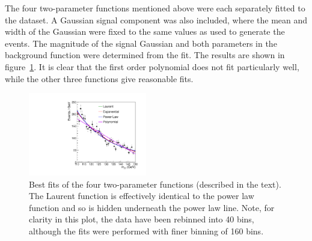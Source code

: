 The four two-parameter functions mentioned above were each
separately fitted to the dataset. A Gaussian signal component was also included, where the
mean and width of the Gaussian were fixed to the same values as used to
generate the events.
The magnitude of the signal Gaussian and both parameters in the
background function were determined from the fit.
The results are shown in figure~\ref{fig:functions:bestfits}.
It is clear that the first order polynomial does not fit particularly well,
while the other three functions give reasonable fits.
%
\begin{figure}[tbp]
\centering
\includegraphics[width=0.46\textwidth]{functions/BestFits.pdf}
\caption{Best fits of the four two-parameter functions (described in the
text).
The Laurent function is effectively identical to the power law function
and so is hidden underneath the power law line.
Note, for clarity in this plot, the
data have been rebinned into 40 bins, although the fits were performed with
finer binning of 160 bins.}
\label{fig:functions:bestfits}
\end{figure}

